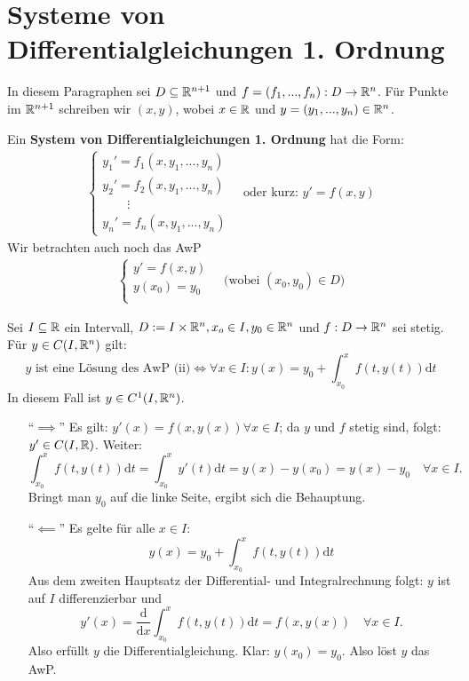 \documentclass[a4paper,twoside,DIV15,BCOR12mm,chapterprefix=true,headings=twolinechapter]{scrbook}
\begin{document}
\chapter{Systeme von Differentialgleichungen 1. Ordnung}

In diesem Paragraphen sei $D \subseteq \mathbb{R}^{n+1}$ und $f = (f_1, ..., f_n): D \to \mathbb{R}^n$. Für Punkte im $\mathbb{R}^{n+1}$ schreiben wir $(x,y)$, wobei $x \in \mathbb{R}$ und $y = (y_1,...,y_n) \in \mathbb{R}^n$.

\begin{definition}
Ein \textbf{System von Differentialgleichungen 1. Ordnung} hat die Form:
\begin{align*}
\begin{cases}
y_1'=f_1(x, y_1, ..., y_n)\\
y_2'=f_2(x, y_1, ..., y_n)\\
\qquad\vdots\\
y_n'=f_n(x, y_1, ..., y_n)
\end{cases}
\tag{i}
\quad\text{oder kurz: } y'=f(x,y)
\end{align*}
Wir betrachten auch noch das AwP
\begin{align*}
\begin{cases}
y'=f(x,y)\\
y(x_0) = y_0\\
\end{cases}
\tag{ii}
\quad\text{(wobei } (x_0, y_0) \in D)
\end{align*}
\end{definition}

\begin{satz}
Sei $I \subseteq \mathbb{R}$ ein Intervall, $D := I \times \mathbb{R}^n, x_o\in I, y_0\in \mathbb{R}^n$ und $f:D\to\mathbb{R}^n$ sei stetig. Für $y\in C(I,\mathbb{R}^n)$ gilt:
\[\text{$y$ ist eine Lösung des AwP (ii)} \iff  \forall x\in I:y(x) = y_0 + \int_{x_0}^x f(t, y(t)) \text{d}t \]
In diesem Fall ist $y \in C^1(I, \mathbb{R}^n)$.
\end{satz}

\begin{beweis}
\begin{enumerate}
\item["`$\implies$"'] Es gilt: $y'(x) = f(x, y(x)) \forall x\in I$; da $y$ und $f$ stetig sind, folgt: $y' \in C(I,\mathbb{R} )$. Weiter:
\[\int_{x_0}^x f(t,y(t)) \text{d}t = \int_{x_0}^x y'(t)\text{d}t = y(x) - y(x_0) = y(x) - y_0 \quad \forall x\in I.\]
Bringt man $y_0$ auf die linke Seite, ergibt sich die Behauptung.
\item["`$\impliedby$"'] Es gelte für alle $x\in I$:
\[y(x) = y_0  + \int_{x_0}^x f(t, y(t))\text{d}t\]
Aus dem zweiten Hauptsatz der Differential- und Integralrechnung folgt: $y$ ist auf $I$ differenzierbar und 
\[ y'(x) = \frac{\text{d}}{\text{d}x} \int_{x_0}^x f(t, y(t))\text{d}t = f(x, y(x)) \quad \forall x \in I. \]
Also erfüllt $y$ die Differentialgleichung.
Klar: $y(x_0) = y_0$. Also löst $y$ das AwP.
\end{enumerate}
\end{beweis}
\end{document}
